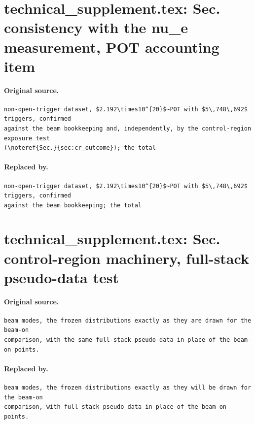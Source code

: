 \documentclass[11pt,a4paper]{article}
\newcommand{\noteref}[2]{#1~\ref{#2} of the analysis note}
\begin{document}
\section{technical\_supplement.tex: Sec. consistency with the nu\_e measurement, POT accounting item}
\paragraph{Original source.}
\begin{lstlisting}[language={[LaTeX]TeX},basicstyle=\ttfamily\footnotesize,columns=fullflexible]
non-open-trigger dataset, $2.192\times10^{20}$~POT with $5\,748\,692$ triggers, confirmed
against the beam bookkeeping and, independently, by the control-region exposure test
(\noteref{Sec.}{sec:cr_outcome}); the total
\end{lstlisting}
\paragraph{Replaced by.}
\begin{lstlisting}[language={[LaTeX]TeX},basicstyle=\ttfamily\footnotesize,columns=fullflexible]
non-open-trigger dataset, $2.192\times10^{20}$~POT with $5\,748\,692$ triggers, confirmed
against the beam bookkeeping; the total
\end{lstlisting}

\section{technical\_supplement.tex: Sec. control-region machinery, full-stack pseudo-data test}
\paragraph{Original source.}
\begin{lstlisting}[language={[LaTeX]TeX},basicstyle=\ttfamily\footnotesize,columns=fullflexible]
beam modes, the frozen distributions exactly as they are drawn for the beam-on
comparison, with the same full-stack pseudo-data in place of the beam-on points.
\end{lstlisting}
\paragraph{Replaced by.}
\begin{lstlisting}[language={[LaTeX]TeX},basicstyle=\ttfamily\footnotesize,columns=fullflexible]
beam modes, the frozen distributions exactly as they will be drawn for the beam-on
comparison, with full-stack pseudo-data in place of the beam-on points.
\end{lstlisting}
\end{document}
